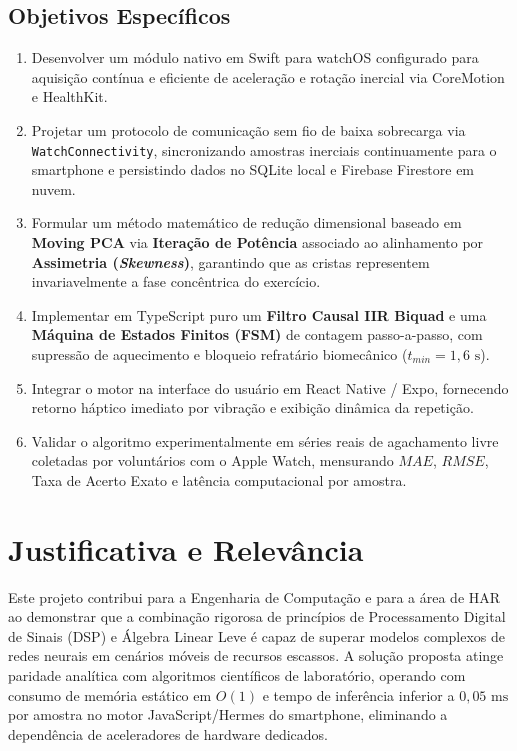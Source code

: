 \documentclass[12pt,openany,oneside,a4paper,english,brazil]{abntex2}
\begin{document}
\subsection{Objetivos Específicos}
\begin{enumerate}
    \item Desenvolver um módulo nativo em Swift para watchOS configurado para aquisição contínua e eficiente de aceleração e rotação inercial via CoreMotion e HealthKit.
    \item Projetar um protocolo de comunicação sem fio de baixa sobrecarga via \texttt{WatchConnectivity}, sincronizando amostras inerciais continuamente para o smartphone e persistindo dados no SQLite local e Firebase Firestore em nuvem.
    \item Formular um método matemático de redução dimensional baseado em \textbf{Moving PCA} via \textbf{Iteração de Potência} associado ao alinhamento por \textbf{Assimetria (\textit{Skewness})}, garantindo que as cristas representem invariavelmente a fase concêntrica do exercício.
    \item Implementar em TypeScript puro um \textbf{Filtro Causal IIR Biquad} e uma \textbf{Máquina de Estados Finitos (FSM)} de contagem passo-a-passo, com supressão de aquecimento e bloqueio refratário biomecânico ($t_{min} = 1{,}6\text{ s}$).
    \item Integrar o motor na interface do usuário em React Native / Expo, fornecendo retorno háptico imediato por vibração e exibição dinâmica da repetição.
    \item Validar o algoritmo experimentalmente em séries reais de agachamento livre coletadas por voluntários com o Apple Watch, mensurando $MAE$, $RMSE$, Taxa de Acerto Exato e latência computacional por amostra.
\end{enumerate}

\section{Justificativa e Relevância}
Este projeto contribui para a Engenharia de Computação e para a área de HAR ao demonstrar que a combinação rigorosa de princípios de Processamento Digital de Sinais (DSP) e Álgebra Linear Leve é capaz de superar modelos complexos de redes neurais em cenários móveis de recursos escassos. A solução proposta atinge paridade analítica com algoritmos científicos de laboratório, operando com consumo de memória estático em $O(1)$ e tempo de inferência inferior a $0{,}05\text{ ms}$ por amostra no motor JavaScript/Hermes do smartphone, eliminando a dependência de aceleradores de hardware dedicados.
\end{document}
